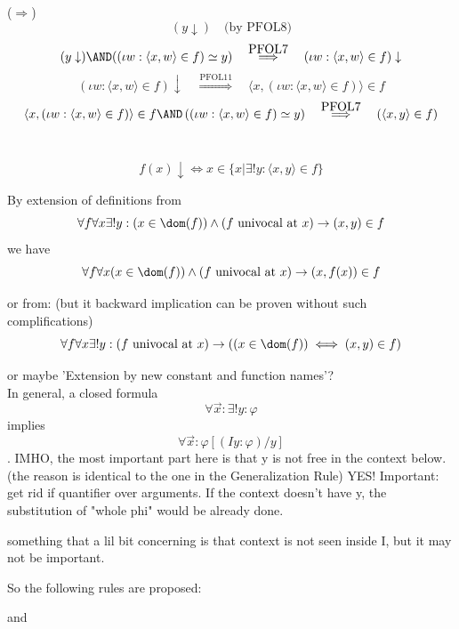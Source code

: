 \noindent($\Rightarrow$)
\[(y\downarrow)\quad\mbox{(by PFOL8)}\]
\[
(y\downarrow)\AND((\iota w: \langle x,w\rangle\in f)\simeq y) \quad\overset{\mbox{PFOL7}}{\Longrightarrow}\quad
(\iota w: \langle x,w\rangle\in f)\downarrow \]
\[
\left(\iota w: \langle x,w\rangle\in f\right)\downarrow 
\quad\overset{\mbox{PFOL11}}{\Longrightarrow}\quad
\langle x,(\iota w: \langle x,w\rangle\in f)\rangle\in f
\]
\[
\langle x,(\iota w: \langle x,w\rangle\in f)\rangle\in f
\AND
\left((\iota w: \langle x,w\rangle\in f)\simeq y\right)
\quad\overset{\mbox{PFOL7}}{\Longrightarrow}\quad
\left(\langle x, y\rangle\in f\right)
\]
\\
\Done
\begin{theorem}
\[
f(x)\downarrow \iff x\in\{x|\exists!y: \langle x,y\rangle\in f\}
\]
\end{theorem}
\Proof
\Done
\pagebreak
By extension of definitions from
\[
\forall f \forall x \exists! y : (x\in \dom(f))\land (f\mbox{ univocal at }x) \to (x,y)\in f
\]
we have
\[
\forall f \forall x (x\in \dom(f))\land (f\mbox{ univocal at }x) \to (x,f(x))\in f
\]

or from: (but it backward implication can be proven without such complifications)
\[
\forall f \forall x \exists! y : (f\mbox{ univocal at }x)\to ((x\in \dom(f)) \iff (x,y)\in f)
\]


or maybe 'Extension by new constant and function names'?\\

In general, a closed formula
\[
\forall \vec{x} : \exists! y: \varphi 
\]
implies
\[
\forall \vec{x} : \varphi[(Iy:\varphi)/y] 
\]
.
IMHO, the most important part here is that y is not free in the context below.
(the reason is identical to the one in the Generalization Rule)
YES!
Important: get rid if quantifier over arguments.
If the context doesn't have y, the substitution of "whole phi" would be already done.

something that a lil bit concerning is that context is not seen inside I, but it may not be important.

So the following rules are proposed:
\begin{prooftree}
\end{prooftree}
and
\begin{prooftree}
\end{prooftree}

\pagebreak




%

